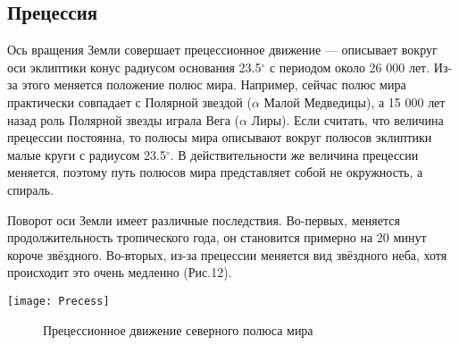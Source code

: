 \subsection{Прецессия}

Ось вращения Земли совершает прецессионное движение --- описывает вокруг оси эклиптики  конус радиусом основания 23.5$^\circ$ с периодом около 26 000 лет. Из-за этого меняется положение полюс мира. Например, сейчас полюс мира практически совпадает с Полярной звездой ($\alpha$ Малой Медведицы), а 15 000 лет назад роль Полярной звезды играла Вега ($\alpha$ Лиры). Если считать, что величина прецессии постоянна, то полюсы мира описывают вокруг полюсов эклиптики малые круги с радиусом 23.5$^\circ$. В действительности же величина прецессии меняется, поэтому путь полюсов мира представляет собой не окружность, а спираль.

Поворот оси Земли имеет различные последствия. Во-первых, меняется продолжительность тропического года, он становится примерно на 20 минут короче звёздного. Во-вторых, из-за прецессии меняется вид звёздного неба, хотя происходит это очень медленно (Рис.12).
\begin{center}
\texttt{[image: Precess]}
\begin{figure}[h!]
\caption{Прецессионное движение северного полюса мира}
\end{figure}
\end{center}